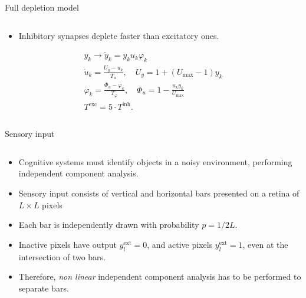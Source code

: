 \documentclass[final,hyperref={pdfpagelabels=false}]{beamer}
\begin{document}
\begin{frame}
\begin{columns}
\begin{column}{.60\textwidth}
\begin{minipage}[T]{.95\textwidth}
{\begin{block}{Full depletion model}
\begin{columns}
\begin{column}[T]{.6\textwidth}
\begin{itemize}
						\item Inhibitory synapses deplete faster than excitatory ones.
					\end{itemize}
					\begin{gather*}
						y_k \rightarrow \tilde{y}_k = y_k u_k \varphi_k \\
						\dot{u}_k = \frac{U_y -u_k}{T_u}, \quad U_y = 1 + \left( U_\text{max} -1 \right) y_k\\ 
						\dot{\varphi}_k = \frac{\varPhi_u - \varphi_k}{T_\varphi}, \quad \varPhi_u = 1- \frac{u_k y_k}{U_\text{max}} \\
						T^{\text{exc}} = 5 \cdot T^{\text{inh}}.
					\end{gather*}
				\end{column}
			\end{columns}
		\end{block}
		\vfil
			\begin{block}{Sensory input}
				\begin{columns}
					\begin{column}[T]{.55\textwidth}		
						\begin{itemize}
							\item Cognitive systems must identify objects in a noisy environment, performing independent component analysis.
							
							\item Sensory input consists of vertical and horizontal bars
							presented on a retina of $L \times L$ pixels
							
							\item Each bar is independently drawn with probability $p=1/2L$.
							
							\item Inactive pixels have output $y_l^{\text{ext}}=0$, and active pixels $y_l^{\text{ext}}=1$, even at the intersection of two bars.
							
							\item Therefore, \emph{non linear} independent component analysis has to be performed to separate bars.
							

\end{itemize}
\end{column}
\end{columns}
\end{block}}
\end{minipage}
\end{column}
\end{columns}
\end{frame}
\end{document}

